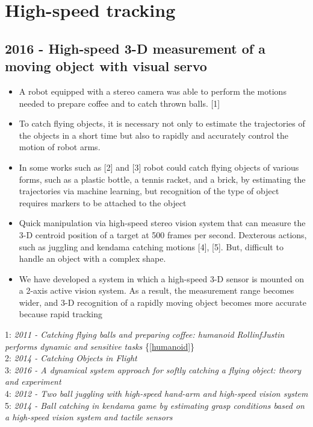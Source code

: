 \vspace{3cm}

\section{High-speed tracking}
\subsection{2016 - High-speed 3-D measurement of a moving object with visual servo}
\begin{itemize}
\item A robot equipped with a stereo camera was able to perform the motions needed to prepare coffee and to catch thrown balls. [1]
\item To catch flying objects, it is necessary not only to estimate the trajectories of the objects in a short time but also to rapidly and accurately control the motion of robot arms.
\item In some works such as [2] and [3] robot could catch flying objects of various forms, such as a plastic bottle, a tennis racket, and a brick, by estimating the trajectories via machine learning, but recognition of the type of object requires markers to be attached to the object
\item Quick manipulation via high-speed stereo vision system that can measure the 3-D centroid position of a target at 500 frames per second. Dexterous actions, such as juggling and kendama catching motions [4], [5]. But, difficult to handle an object with a complex shape.
\item  We have developed a system in which a high-speed 3-D sensor is mounted on a 2-axis active vision system. As a result, the measurement range becomes wider, and 3-D recognition of a
rapidly moving object becomes more accurate because rapid
tracking
\end{itemize}
1: \textit{2011 -  Catching flying balls and preparing coffee: humanoid RollinfJustin performs dynamic and sensitive tasks} \{\ref{humanoid}\} \\
2: \textit{2014 -  Catching Objects in Flight} \\
3: \textit{2016 - A dynamical system
approach for softly catching a flying object: theory and experiment} \\
4: \textit{2012 - Two ball
juggling with high-speed hand-arm and high-speed vision system} \\
5: \textit{2014 - Ball catching in kendama game by estimating
grasp conditions based on a high-speed vision system and tactile
sensors}

